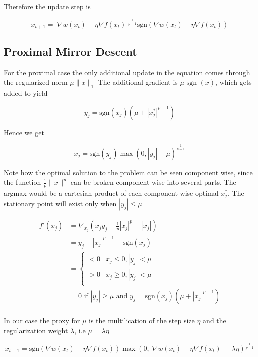 Therefore the update step is 

\begin{equation}
\label{eq:mirror_descent}
    x_{t+1} =  | \nabla w(x_t) - \eta \nabla f(x_t) |^{\frac{1}{p-1}} \text{sgn}(\nabla w(x_t) - \eta \nabla f(x_t))
\end{equation}

\subsection*{Proximal Mirror Descent}

For the proximal case the only additional update in the equation comes through the regularized norm  $\mu \| x \|_1$
The additional gradient is $\mu \text{ sgn }(x)$, which gets added to yield 

$$
y_j = \text{sgn}(x_j) ( \mu +  |x_j^*|^{p-1} )
$$

Hence we get 

$$
    x_j = \text{sgn}(y_j) \max(0, |y_j| - \mu)^{\frac{1}{p-1}}
$$

Note how the optimal solution to the problem can be seen component wise, since the function $\frac{1}{p} \| x \|^p$ can be broken component-wise into several parts.
The argmax would be a cartesian product of each component wise optimal $x_j^*$. The stationary point will exist only when $|y_j| \le \mu$


\begin{align*}
    f'(x_j) &= \nabla_{x_j} (x_jy_j  - \frac{1}{p} |x_j|^p - |x_j|) \\\
    &= y_j - |x_j|^{p-1} - \text{sgn}(x_j) \\
    &= \begin{cases} 
        < 0 & x_j\leq 0, |y_j| < \mu \\
        > 0  & x_j \geq 0, |y_j| < \mu  \\
     \end{cases}\\
    &= 0 \text{ if } |y_j| \ge \mu \text{ and } y_j = \text{sgn}(x_j) ( \mu + |x_j|^{p-1})\\
\end{align*}

In our case the proxy for $\mu$ is the multilication of the step size $\eta$ and the regularization weight $\lambda$, i.e $\mu = \lambda \eta$

\begin{equation}
    \label{eq: psmd}
    x_{t + 1} = \text{sgn}(\nabla w(x_t) - \eta \nabla f(x_t)) \max(0, |\nabla w(x_t) - \eta \nabla f(x_t)| - \lambda \eta)^{\frac{1}{p-1}}
\end{equation}

